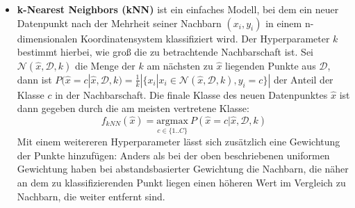 \begin{itemize}

   \item \textbf{k-Nearest Neighbors (kNN)} ist ein einfaches Modell, bei dem ein neuer Datenpunkt nach der
    Mehrheit seiner Nachbarn $(x_i, y_i)$ in einem n-dimensionalen Koordinatensystem klassifiziert wird. Der
    Hyperparameter $k$ bestimmt hierbei, wie groß die zu betrachtende Nachbarschaft ist. Sei
            $\mathcal{N}(\hat{x}, \mathcal{D}, k)$
    die Menge der $k$ am nächsten zu $\hat{x}$ liegenden Punkte aus $\mathcal{D}$, dann ist
            $P(\hat{x}=c|\hat{x}, \mathcal{D}, k) = \frac{1}{k} |\{x_i | x_i \in \mathcal{N}(\hat{x}, \mathcal{D}, k), y_i=c\}|$
    der Anteil der Klasse $c$ in der Nachbarschaft. Die finale Klasse des neuen Datenpunktes $\hat{x}$ ist dann
    gegeben durch die am meisten vertretene Klasse:
    \begin{equation}
            f_{kNN}(\hat{x}) = \underset{c \in \{1..C\}}{\mathrm{argmax}}\ P(\hat{x}=c|\hat{x}, \mathcal{D}, k)
    \end{equation}
    Mit einem weitereren Hyperparameter lässt sich zusätzlich eine Gewichtung der Punkte hinzufügen: Anders als
    bei der oben beschriebenen uniformen Gewichtung haben bei abstandsbasierter Gewichtung die Nachbarn, die näher
    an dem zu klassifizierenden Punkt liegen einen höheren Wert im Vergleich zu Nachbarn, die weiter entfernt sind.


\end{itemize}
